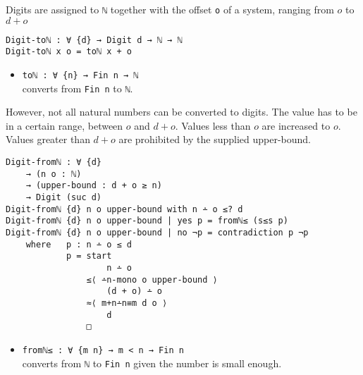 \documentclass[../thesis.tex]{subfiles}
\begin{document}
\begin{center}
\end{center}

Digits are assigned to {\lstinline|ℕ|} together with the offset {\lstinline|o|} of a system,
ranging from $ o $ to $ d + o $

\begin{lstlisting}
Digit-toℕ : ∀ {d} → Digit d → ℕ → ℕ
Digit-toℕ x o = toℕ x + o
\end{lstlisting}

\begin{itemize}
    \item {\lstinline|toℕ : ∀ {n} → Fin n → ℕ|}
        \\ converts from {\lstinline|Fin n|} to {\lstinline|ℕ|}.
\end{itemize}


However, not all natural numbers can be converted to digits.
The value has to be in a certain range, between $ o $ and $ d + o $.
Values less than $ o $ are increased to $ o $.
Values greater than $ d + o $ are prohibited by the supplied upper-bound.

\begin{lstlisting}
Digit-fromℕ : ∀ {d}
    → (n o : ℕ)
    → (upper-bound : d + o ≥ n)
    → Digit (suc d)
Digit-fromℕ {d} n o upper-bound with n ∸ o ≤? d
Digit-fromℕ {d} n o upper-bound | yes p = fromℕ≤ (s≤s p)
Digit-fromℕ {d} n o upper-bound | no ¬p = contradiction p ¬p
    where   p : n ∸ o ≤ d
            p = start
                    n ∸ o
                ≤⟨ ∸n-mono o upper-bound ⟩
                    (d + o) ∸ o
                ≈⟨ m+n∸n≡m d o ⟩
                    d
                □
\end{lstlisting}

\begin{itemize}
    \item {\lstinline|fromℕ≤ : ∀ {m n} → m < n → Fin n|}
        \\ converts from {\lstinline|ℕ|} to {\lstinline|Fin n|} given the number is small enough.
\end{itemize}
\end{document}
